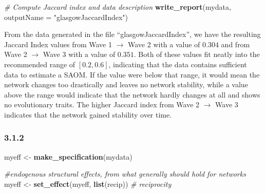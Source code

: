 \documentclass[
]{article}
\newenvironment{Shaded}{\begin{snugshade}}{\end{snugshade}}
\newcommand{\AttributeTok}[1]{\textcolor[rgb]{0.13,0.29,0.53}{#1}}
\newcommand{\CommentTok}[1]{\textcolor[rgb]{0.56,0.35,0.01}{\textit{#1}}}
\newcommand{\DecValTok}[1]{\textcolor[rgb]{0.00,0.00,0.81}{#1}}
\newcommand{\FunctionTok}[1]{\textcolor[rgb]{0.13,0.29,0.53}{\textbf{#1}}}
\newcommand{\NormalTok}[1]{#1}
\newcommand{\OtherTok}[1]{\textcolor[rgb]{0.56,0.35,0.01}{#1}}
\newcommand{\SpecialCharTok}[1]{\textcolor[rgb]{0.81,0.36,0.00}{\textbf{#1}}}
\newcommand{\StringTok}[1]{\textcolor[rgb]{0.31,0.60,0.02}{#1}}
\begin{document}
\begin{Shaded}
\end{Shaded}

\begin{Shaded}
\begin{Highlighting}[]
\CommentTok{\# Compute Jaccard index and data description}
\FunctionTok{write\_report}\NormalTok{(mydata, }\AttributeTok{outputName =} \StringTok{"glasgowJaccardIndex"}\NormalTok{)}
\end{Highlighting}
\end{Shaded}

From the data generated in the file ``glasgowJaccardIndex'', we have the
resulting Jaccard Index values from Wave 1 \(\rightarrow\) Wave 2 with a
value of \(0.304\) and from Wave 2 \(\rightarrow\) Wave 3 with a value
of \(0.351\). Both of these values fit neatly into the recommended range
of \([0.2,0.6]\), indicating that the data contains sufficient data to
estimate a SAOM. If the value were below that range, it would mean the
network changes too drastically and leaves no network stability, while a
value above the range would indicate that the network hardly changes at
all and shows no evolutionary traits. The higher Jaccard index from Wave
2 \(\rightarrow\) Wave 3 indicates that the network gained stability
over time.

\subsubsection{3.1.2}\label{section-11}

\begin{Shaded}
\begin{Highlighting}[]
\NormalTok{myeff }\OtherTok{\textless{}{-}} \FunctionTok{make\_specification}\NormalTok{(mydata)}

\CommentTok{\#endogenous structural effects, from what generally should hold for networks}
\NormalTok{myeff }\OtherTok{\textless{}{-}} \FunctionTok{set\_effect}\NormalTok{(myeff, }\FunctionTok{list}\NormalTok{(recip))       }\CommentTok{\# reciprocity}
\end{Highlighting}
\end{Shaded}
\end{document}
